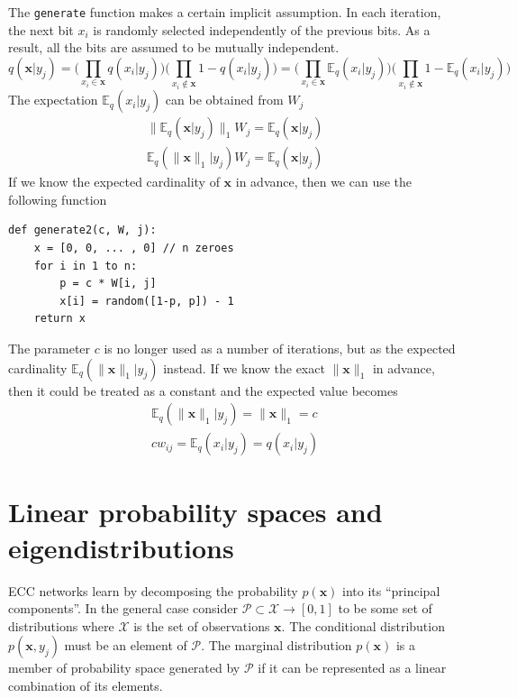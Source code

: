 \documentclass[12pt]{article}
\begin{document}
The \texttt{generate} function makes a certain implicit assumption. In each iteration, the next bit $x_i$ is randomly selected independently of the previous bits. As a result, all the bits are assumed to be mutually independent. 
\[
q(\boldsymbol{x}|y_j) = \big(\prod_{x_i\in\boldsymbol{x}} q(x_i|y_j)\big)\big(\prod_{x_i\notin\boldsymbol{x}} 1-q(x_i|y_j)\big) = \big(\prod_{x_i\in\boldsymbol{x}} \mathbb{E}_q(x_i|y_j) \big) \big(\prod_{x_i\notin\boldsymbol{x}} 1-\mathbb{E}_q(x_i|y_j) \big)
\]
The expectation $\mathbb{E}_q(x_i|y_j) $ can be obtained from $W_j$ 
\begin{gather*}
\lVert \mathbb{E}_q(\boldsymbol{x}|y_j) \rVert _1 W_j = \mathbb{E}_q(\boldsymbol{x}|y_j) \\
\mathbb{E}_q(\lVert  \boldsymbol{x} \rVert _1|y_j)  W_j = \mathbb{E}_q(\boldsymbol{x}|y_j) 
\end{gather*}
If we know the expected cardinality of $\boldsymbol{x}$ in advance, then we can use the following function
\begin{lstlisting}
def generate2(c, W, j):
    x = [0, 0, ... , 0] // n zeroes
    for i in 1 to n:
        p = c * W[i, j]
        x[i] = random([1-p, p]) - 1
    return x
\end{lstlisting}
The parameter $c$ is no longer used as a number of iterations, but as the expected cardinality $\mathbb{E}_q(\lVert  \boldsymbol{x} \rVert _1|y_j)$ instead. If we know the exact $\lVert  \boldsymbol{x} \rVert _1$ in advance, then it could be treated as a constant and the expected value becomes 
\begin{gather*}
\mathbb{E}_q(\lVert  \boldsymbol{x} \rVert _1|y_j)= \lVert  \boldsymbol{x} \rVert _1 = c \\
c w_{ij} = \mathbb{E}_q(x_i|y_j) = q(x_i|y_j)
\end{gather*}


\section{Linear probability spaces and eigendistributions}

ECC networks learn by decomposing the probability $p(\boldsymbol{x})$ into its ``principal components''.   In the general case consider  $\mathcal{P} \subset \mathcal{X} \rightarrow [0,1]$ to be some set of distributions where $\mathcal{X}$ is the set of observations $\boldsymbol{x}$. The conditional distribution $p(\boldsymbol{x},y_j)$ must be an element of $\mathcal{P}$. The marginal distribution $p(\boldsymbol{x})$ is a member of probability space generated by $\mathcal{P}$ if it can be represented as a linear combination of its elements.
\end{document}
